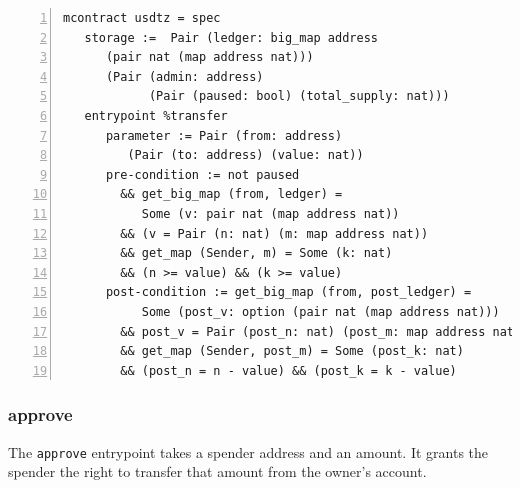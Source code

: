 \documentclass[a4paper,USenglish,cleveref, autoref, thm-restate]{lipics-v2021}
\begin{document}
\begin{lstlisting}[float,captionpos=b,caption={Specification of the \lstinline/transfer/ entrypoint},label={lst:specification-transfer},numbers=left]
mcontract usdtz = spec 
   storage :=  Pair (ledger: big_map address 
      (pair nat (map address nat))) 
      (Pair (admin: address) 
            (Pair (paused: bool) (total_supply: nat)))
   entrypoint %transfer
      parameter := Pair (from: address)
         (Pair (to: address) (value: nat))
      pre-condition := not paused 
        && get_big_map (from, ledger) = 
           Some (v: pair nat (map address nat))
        && (v = Pair (n: nat) (m: map address nat))
        && get_map (Sender, m) = Some (k: nat) 
        && (n >= value) && (k >= value)
      post-condition := get_big_map (from, post_ledger) = 
           Some (post_v: option (pair nat (map address nat))) 
        && post_v = Pair (post_n: nat) (post_m: map address nat) 
        && get_map (Sender, post_m) = Some (post_k: nat) 
        && (post_n = n - value) && (post_k = k - value)
\end{lstlisting}

\subsubsection{approve}
\label{sec:approve}

The \texttt{approve} entrypoint takes a spender address and an
amount. It grants the spender the right to transfer that amount from
the owner's account.
\end{document}
